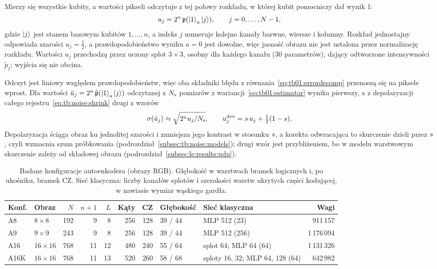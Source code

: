 Mierzy się wszystkie kubity, a wartości pikseli odczytuje z tej połowy rozkładu, w której kubit pomocniczy dał wynik 1:
\begin{equation}\label{eq:le:readout}
u_j=2^n\,\mathfrak{p}(\ket{1}_a\ket{j}),\qquad j=0,\dots,N-1,
\end{equation}
gdzie $\ket{j}$ jest stanem bazowym kubitów $1,\dots,n$, a indeks $j$ numeruje kolejno kanały barwne, wiersze i kolumny.
Rozkład jednostajny odpowiada szarości $u_j=\tfrac{1}{2}$, a prawdopodobieństwo wyniku $a=0$ jest dowolne, więc jasność obrazu nie jest ustalona przez normalizację rozkładu.
Wartości $u_j$ przechodzą przez uczony splot $3\times3$, osobny dla każdego kanału (30 parametrów), dający odtworzone intensywności $\tilde{p}_j$; wyjścia się nie obcina.

Odczyt jest liniowy względem prawdopodobieństw, więc oba składniki błędu z równania~\eqref{eq:tb01:errordecomp} przenoszą się na piksele wprost.
Dla wartości $\tilde{u}_j=2^n\,\tilde{\mathfrak{p}}(\ket{1}_a\ket{j})$ odczytanej z $N_{\mathrm{s}}$ pomiarów z wariancji~\eqref{eq:tb01:estimator} wynika pierwszy, a z depolaryzacji całego rejestru~\eqref{eq:tb:noise:shrink} drugi z wzorów
\begin{equation}\label{eq:le:noise}
\sigma(\tilde{u}_j)\approx\sqrt{2^n u_j/N_{\mathrm{s}}},
\qquad
u_j^{\mathrm{dev}}=s\,u_j+\tfrac{1}{2}(1-s).
\end{equation}
Depolaryzacja ściąga obraz ku jednolitej szarości i zmniejsza jego kontrast w stosunku $s$, a korekta odwracająca to skurczenie dzieli przez $s$, czyli wzmacnia szum próbkowania (podrozdział~\ref{subsec:tb:noise:models}); drugi wzór jest przybliżeniem, bo w modelu warstwowym skurczenie zależy od składowej obrazu (podrozdział~\ref{subsec:le:results:pdu}).

\begin{table}[tb]
\centering
\caption[Badane konfiguracje autoenkodera]{Badane konfiguracje autoenkodera (obrazy RGB). Głębokość w warstwach bramek logicznych i, po ukośniku, bramek CZ. Sieć klasyczna: liczby kanałów splotów i szerokości warstw ukrytych części kodującej, w nawiasie wymiar wąskiego gardła.}
\label{tab:le:configs}
\footnotesize
\setlength{\tabcolsep}{4pt}
\begin{tabular}{@{}llrrrrrllr@{}}
\toprule
Konf. & Obraz & $N$ & $n+1$ & $L$ & Kąty & CZ & Głębokość & Sieć klasyczna & Wagi \\
\midrule
A8 & $8\times8$ & 192 & 9 & 8 & 256 & 128 & 39 / 44 & MLP 512 (23) & 911\,157 \\
A9 & $9\times9$ & 243 & 9 & 8 & 256 & 128 & 39 / 44 & MLP 512 (256) & 1\,176\,094 \\
A16 & $16\times16$ & 768 & 11 & 12 & 480 & 240 & 55 / 64 & splot 64; MLP 64 (64) & 1\,131\,326 \\
A16K & $16\times16$ & 768 & 11 & 13 & 520 & 260 & 58 / 68 & sploty 16, 32; MLP 64, 128 (64) & 642\,982 \\
\bottomrule
\end{tabular}
\end{table}

